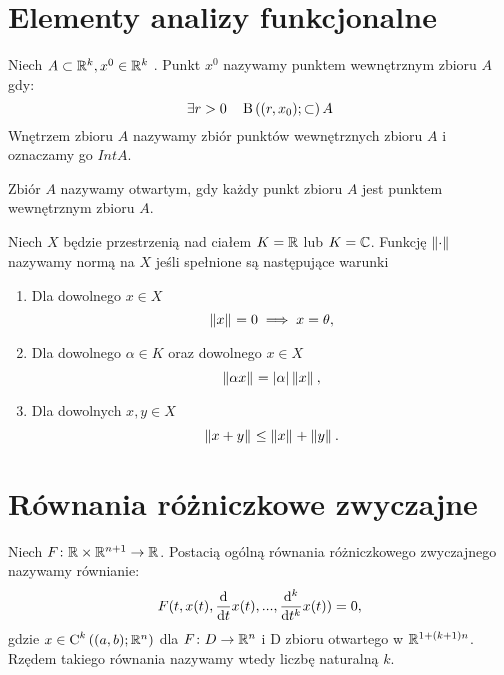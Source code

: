 \documentclass[12pt,a4paper]{report}
\begin{document}
\section{Elementy analizy funkcjonalne}

\begin{definition} 
Niech $A \subset \setR^k, x^0 \in \setR^k$ . Punkt $x^0$ nazywamy punktem wewnętrznym zbioru $A$ gdy:
$$
\exists  r>0 \quad   \ball{(r,x_0)} \subset A
$$
Wnętrzem zbioru $A$ nazywamy zbiór punktów wewnętrznych zbioru $A$ i oznaczamy go $IntA$.
\end{definition}

\begin{definition}  
Zbiór $A$ nazywamy otwartym, gdy każdy punkt zbioru $A$ jest punktem wewnętrznym zbioru $A$. 
\end{definition}

\begin{definition} [Norma]
Niech $X$ będzie przestrzenią nad ciałem $K =\setR $ lub $ K = \setC $. Funkcję $\norm{\cdot}$ nazywamy normą na $X$ jeśli spełnione są następujące warunki 
\begin{enumerate}
\item Dla dowolnego $x\in X$
$$
 \norm{x} = 0 \implies x = \theta,
$$
\item Dla dowolnego $\alpha \in K$ oraz dowolnego $x \in X$ 
$$
\norm{\alpha x}  = \abs{\alpha}  \norm{x},
$$
\item Dla dowolnych $x,y\in X$
$$
 \norm{x+y} \leq \norm{x} + \norm{y}.
$$
\end{enumerate}

\end{definition}

\section{Równania różniczkowe zwyczajne}

\begin{definition} 
Niech $F \colon \setR \times \setR^{n+1} \to \setR$. Postacią ogólną równania różniczkowego zwyczajnego nazywamy równianie: 
\begin{equation*}
F(t, x(t), \ddx{t} x(t),..., \ddx[^k]{t^k} x(t) ) = 0,
\end{equation*}
gdzie $x \in \Ck{k}{(a,b); \setR^n}$ dla $F \colon D \to \setR^n$ i D zbioru otwartego w $\setR^{1+(k+1)n}$. 
Rzędem takiego równania nazywamy wtedy liczbę naturalną $k$. 
\end{definition}
\end{document}
